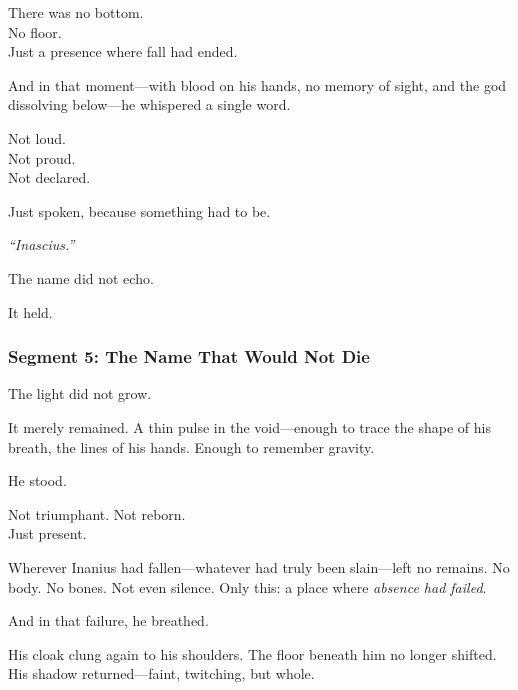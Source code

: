 \documentclass[9pt]{article}
\begin{document}
\vspace{0.5em}
There was no bottom.\\
No floor.\\
Just a presence where fall had ended.

\vspace{0.5em}
And in that moment---with blood on his hands, no memory of sight, and the god dissolving below---he whispered a single word.

\vspace{0.5em}
Not loud.\\
Not proud.\\
Not declared.

\vspace{0.5em}
Just spoken, because something had to be.

\vspace{0.5em}
\textit{``Inascius.''}

\vspace{0.5em}
The name did not echo.

\vspace{0.5em}
It held.

\newpage

\subsubsection*{Segment 5: The Name That Would Not Die}

The light did not grow.

\vspace{0.5em}
It merely remained. A thin pulse in the void---enough to trace the shape of his breath, the lines of his hands. Enough to remember gravity.

\vspace{0.5em}
He stood.

\vspace{0.5em}
Not triumphant. Not reborn.\\
Just present.

\vspace{0.5em}
Wherever Inanius had fallen---whatever had truly been slain---left no remains. No body. No bones. Not even silence. Only this: a place where \textit{absence had failed}.

\vspace{0.5em}
And in that failure, he breathed.

\vspace{0.5em}
His cloak clung again to his shoulders. The floor beneath him no longer shifted. His shadow returned---faint, twitching, but whole.
\end{document}
